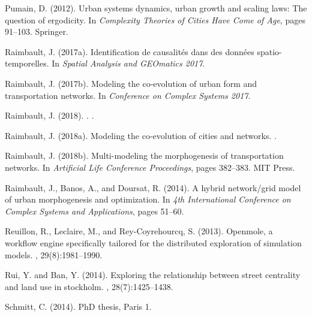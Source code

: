 \documentclass[11pt]{article}
\begin{document}
\begin{thebibliography}{}
Pumain, D. (2012).
\newblock Urban systems dynamics, urban growth and scaling laws: The question
  of ergodicity.
\newblock In {\em Complexity Theories of Cities Have Come of Age}, pages
  91--103. Springer.

Raimbault, J. (2017a).
\newblock Identification de causalit{\'e}s dans des donn{\'e}es
  spatio-temporelles.
\newblock In {\em Spatial Analysis and GEOmatics 2017}.

Raimbault, J. (2017b).
\newblock Modeling the co-evolution of urban form and transportation networks.
\newblock In {\em Conference on Complex Systems 2017}.

{Raimbault}, J. (2018).
.
.

Raimbault, J. (2018a).
\newblock Modeling the co-evolution of cities and networks.
.

Raimbault, J. (2018b).
\newblock Multi-modeling the morphogenesis of transportation networks.
\newblock In {\em Artificial Life Conference Proceedings}, pages 382--383. MIT
  Press.

Raimbault, J., Banos, A., and Doursat, R. (2014).
\newblock A hybrid network/grid model of urban morphogenesis and optimization.
\newblock In {\em 4th International Conference on Complex Systems and
  Applications}, pages 51--60.

Reuillon, R., Leclaire, M., and Rey-Coyrehourcq, S. (2013).
\newblock Openmole, a workflow engine specifically tailored for the distributed
  exploration of simulation models.
, 29(8):1981--1990.

Rui, Y. and Ban, Y. (2014).
\newblock Exploring the relationship between street centrality and land use in
  stockholm.
,
  28(7):1425--1438.

Schmitt, C. (2014).
\newblock PhD thesis, Paris 1.


\end{thebibliography}
\end{document}
